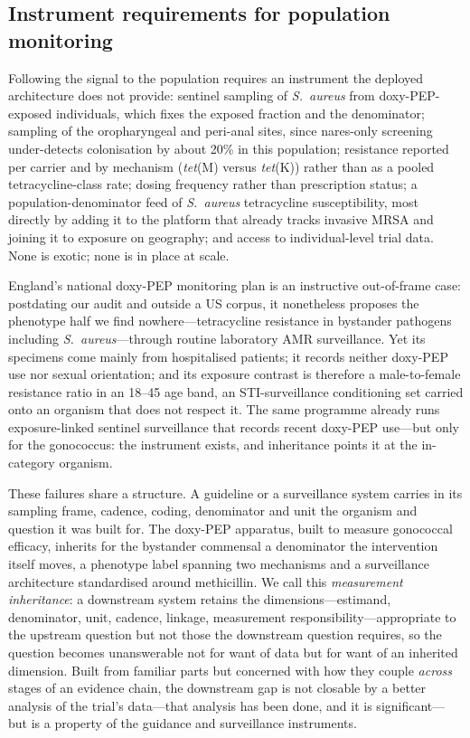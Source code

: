 \documentclass[12pt,a4paper]{article}
\newcommand{\sa}{\emph{S.~aureus}}
\begin{document}
\subsection*{Instrument requirements for population monitoring}
Following the signal to the population requires an instrument the deployed
architecture does not provide: sentinel sampling of \sa{} from doxy-PEP-exposed
individuals, which fixes the exposed fraction and the denominator; sampling of the
oropharyngeal and peri-anal sites, since nares-only screening under-detects
colonisation by about 20\% in this population\cite{kyaw2012}; resistance reported
per carrier and by mechanism (\emph{tet}(M) versus \emph{tet}(K)) rather than as a
pooled tetracycline-class rate; dosing frequency rather than prescription status; a
population-denominator feed of \sa{} tetracycline susceptibility, most directly by
adding it to the platform that already tracks invasive MRSA and joining it to
exposure on geography; and access to individual-level trial data. None is exotic;
none is in place at scale.

England's national doxy-PEP monitoring plan is an instructive out-of-frame case:
postdating our audit and outside a US corpus, it nonetheless proposes the phenotype
half we find nowhere---tetracycline resistance in bystander pathogens including
\sa{}---through routine laboratory AMR surveillance.\cite{ukhsa2026} Yet its
specimens come mainly from hospitalised patients; it records neither doxy-PEP use
nor sexual orientation; and its exposure contrast is therefore a male-to-female
resistance ratio in an 18--45 age band, an STI-surveillance conditioning set
carried onto an organism that does not respect it. The same programme already runs
exposure-linked sentinel surveillance that records recent doxy-PEP use---but only
for the gonococcus: the instrument exists, and inheritance points it at the
in-category organism.

These failures share a structure. A guideline or a surveillance system carries in
its sampling frame, cadence, coding, denominator and unit the organism and
question it was built for. The doxy-PEP apparatus, built to measure gonococcal
efficacy, inherits for the bystander commensal a denominator the intervention
itself moves, a phenotype label spanning two mechanisms and a surveillance
architecture standardised around methicillin. We call this \emph{measurement
inheritance}: a downstream system retains the dimensions---estimand, denominator,
unit, cadence, linkage, measurement responsibility---appropriate to the upstream
question but not those the downstream question requires, so the question becomes
unanswerable not for want of data but for want of an inherited dimension. Built
from familiar parts but concerned with how they couple \emph{across} stages of an
evidence chain,\cite{tancredi2024surveillance,treem2023visibility} the downstream
gap is not closable by a better analysis of the trial's data---that analysis has
been done, and it is significant---but is a property of the guidance and
surveillance instruments.
\end{document}
